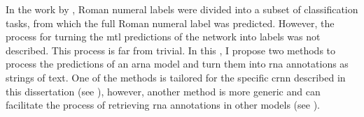 
In the work by \textcite{chen2018functional}, Roman numeral
labels were divided into a subset of classification tasks,
from which the full Roman numeral label was predicted.
However, the process for turning the \gls{mtl} predictions
of the network into labels was not described. This process
is far from trivial. In this \thesisdiss{}, I propose two
methods to process the predictions of an \gls{arna} model
and turn them into \gls{rna} annotations as strings of text.
One of the methods is tailored for the specific \gls{crnn}
described in this dissertation (see
), however, another method is more
generic and can facilitate the process of retrieving
\gls{rna} annotations in other models (see
).
